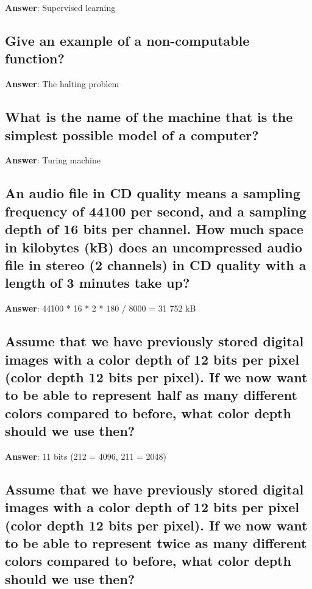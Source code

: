 \documentclass[a4paper,11pt,oneside]{article}
\begin{document}
\begin{sloppypar}
\label{q:62:sa:en:True}

\textbf{Answer}: Supervised learning



\subsection{Give an example of a non-computable function?}

\label{q:63:sa:en:True}

\textbf{Answer}: The halting problem



\subsection{What is the name of the machine that is the simplest possible model of a computer?}

\label{q:64:sa:en:True}

\textbf{Answer}: Turing machine



\subsection{An audio file in CD quality means a sampling frequency of 44100 per second, and a sampling depth of 16 bits per channel. How much space in kilobytes (kB) does an uncompressed audio file in stereo (2 channels) in CD quality with a length of 3 minutes take up?}

\label{q:65:sa:en:True}

\textbf{Answer}: 44100 * 16 * 2 * 180 / 8000 = 31 752 kB



\subsection{Assume that we have previously stored digital images with a color depth of 12 bits per pixel (color depth 12 bits per pixel). If we now want to be able to represent half as many different colors compared to before, what color depth should we use then?}

\label{q:66:sa:en:True}

\textbf{Answer}: 11 bits (212 = 4096, 211 = 2048)



\subsection{Assume that we have previously stored digital images with a color depth of 12 bits per pixel (color depth 12 bits per pixel). If we now want to be able to represent twice as many different colors compared to before, what color depth should we use then?}


\end{sloppypar}
\end{document}
